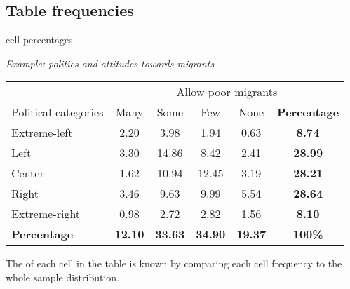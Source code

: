 \documentclass{beamer}
\begin{document}
	
	\subsection{Table frequencies}

	\begin{frame}[t]{ cell percentages}
	
\begin{center}\vspace{-1em}
\textit{Example: politics and attitudes towards migrants}\\[1em]
\begin{tabular}{lccccc}
\toprule
& \multicolumn{5}{c}{Allow poor migrants}	\\
\cmidrule(r){2-6}
Political categories & Many & Some	& Few & None & \textbf{Percentage}\\
\cmidrule(r){1-6}
Extreme-left	& 2.20 & 3.98	& 1.94	 & 0.63	 & \textbf{8.74}\\
Left	 		& 3.30 & 14.86	& 8.42	 & 2.41 & \textbf{28.99}\\
Center	 		& 1.62 & 10.94	& 12.45  & 3.19 & \textbf{28.21}\\
Right	 		& 3.46 & 9.63	& 9.99	 & 5.54 & \textbf{28.64}\\
Extreme-right	& 0.98 & 2.72	& 2.82	 & 1.56 & \textbf{8.10}\\
\textbf{Percentage}	& \textbf{12.10} & \textbf{33.63} & \textbf{34.90}	& \textbf{19.37} & \textbf{100\%}\\
\bottomrule
\end{tabular}
\end{center}
	
	The  of each cell in the table is known by comparing each cell frequency to the whole sample distribution.
	
	\end{frame}
	
\end{document}
